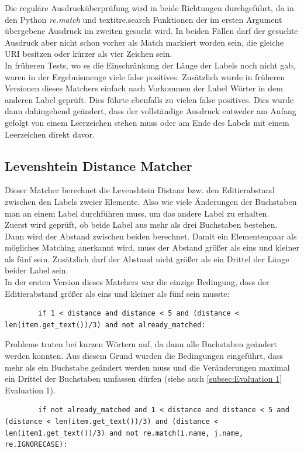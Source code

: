 		Die reguläre Ausdrucküberprüfung wird in beide Richtungen durchgeführt, da in
		den Python \textit{re.match} und textit{re.search} Funktionen der im ersten
		Argument übergebene Ausdruck im zweiten gesucht wird. In beiden Fällen darf
		der gesuchte Ausdruck aber nicht schon vorher als Match markiert worden sein,
		die gleiche URI besitzen oder kürzer als vier Zeichen sein.\\
		In früheren Tests, wo es die Einschränkung der Länge der Labels noch nicht
		gab, waren in der Ergebnismenge viele false positives. Zusätzlich wurde in
		früheren Versionen dieses Matchers einfach nach Vorkommen der Label Wörter in
		dem anderen Label geprüft. Dies führte ebenfalls zu vielen false positives.
		Dies wurde dann dahingehend geändert, dass der vollständige Ausdruck entweder
		am Anfang gefolgt von einem Leerzeichen stehen muss oder am Ende des Labels mit
		einem Leerzeichen direkt davor.
		
		\subsection{Levenshtein Distance Matcher}
		Dieser Matcher berechnet die Levenshtein Distanz bzw. den Editierabstand
		zwischen den Labels zweier Elemente. Also wie viele Änderungen der Buchstaben
		man an einem Label durchführen muss, um das andere Label zu erhalten.\\
		Zuerst wird geprüft, ob beide Label aus mehr als drei Buchstaben bestehen.
		Dann wird der Abstand zwischen beiden berechnet. Damit ein
		Elementenpaar als mögliches Matching anerkannt wird, muss der Abstand größer
		als eins und kleiner als fünf sein. Zusätzlich darf der Abstand nicht größer
		als ein Drittel der Länge beider Label sein.\\
		In der ersten Version dieses Matchers war die einzige Bedingung, dass der
		Editierabstand größer als eins und kleiner als fünf sein musste:
		\begin{lstlisting}
		if 1 < distance and distance < 5 and (distance < len(item.get_text())/3) and not already_matched:
		\end{lstlisting}
		Probleme traten bei kurzen Wörtern auf, da dann alle Buchstaben geändert
		werden konnten. Aus diesem Grund wurden die Bedingungen eingeführt, dass mehr als ein Buchstabe
		geändert werden muss und die Veränderungen maximal ein Drittel der Buchstaben
		umfassen dürfen (siehe auch \ref{subsec:Evaluation 1} Evaluation 1).
		\begin{lstlisting}
		if not already_matched and 1 < distance and distance < 5 and (distance < len(item.get_text())/3) and (distance < len(item1.get_text())/3) and not re.match(i.name, j.name, re.IGNORECASE):
		\end{lstlisting}
				
